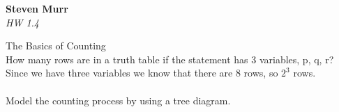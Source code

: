 \documentclass{article}
\begin{document}
\setcounter{totalnumber}{5}
   \begin{flushright}
      \Large\textbf{Steven Murr}\\
      \large\textit{HW 1.4}
   \end{flushright}
\begin{flushleft}
\makeatletter%
\setlength{\@fptop}{5pt}
 The Basics of Counting \\
How many rows are in a truth table if the statement has 3 variables, p, q, r? \\
Since we have three variables we know that there are 8 rows, so $2^3$ rows. \\
~\\
Model the counting process by using a tree diagram. \\

\end{flushleft}
\end{document}
